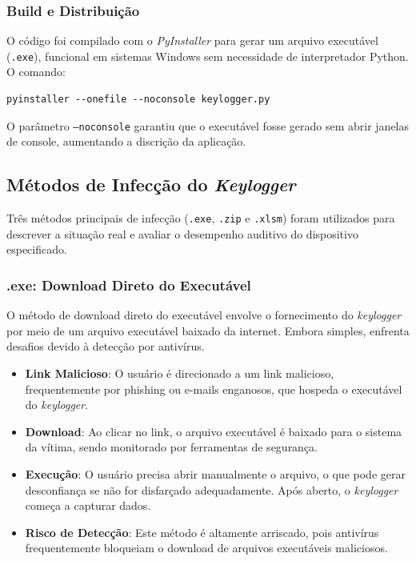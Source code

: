 \documentclass[12pt]{article}
\begin{document}
\subsubsection{Build e Distribuição}

O código foi compilado com o \textit{PyInstaller} para gerar um arquivo executável (\texttt{.exe}), funcional em sistemas Windows sem necessidade de interpretador Python. O comando:

\begin{verbatim} 
pyinstaller --onefile --noconsole keylogger.py 
\end{verbatim}

O parâmetro \texttt{--noconsole} garantiu que o executável fosse gerado sem abrir janelas de console, aumentando a discrição da aplicação.

\subsection{Métodos de Infecção do \textit{Keylogger}}
Três métodos principais de infecção (\texttt{.exe}, \texttt{.zip} e \texttt{.xlsm}) foram utilizados para descrever a situação real e avaliar o desempenho auditivo do dispositivo especificado.

\subsubsection{.exe: Download Direto do Executável}

O método de download direto do executável envolve o fornecimento do \textit{keylogger} por meio de um arquivo executável baixado da internet. Embora simples, enfrenta desafios devido à detecção por antivírus.

\begin{itemize}
    \item \textbf{Link Malicioso}: O usuário é direcionado a um link malicioso, frequentemente por phishing ou e-mails enganosos, que hospeda o executável do \textit{keylogger}.
    \item \textbf{Download}: Ao clicar no link, o arquivo executável é baixado para o sistema da vítima, sendo monitorado por ferramentas de segurança.
    \item \textbf{Execução}: O usuário precisa abrir manualmente o arquivo, o que pode gerar desconfiança se não for disfarçado adequadamente. Após aberto, o \textit{keylogger} começa a capturar dados.
    \item \textbf{Risco de Detecção}: Este método é altamente arriscado, pois antivírus frequentemente bloqueiam o download de arquivos executáveis maliciosos.
\end{itemize}
\end{document}
